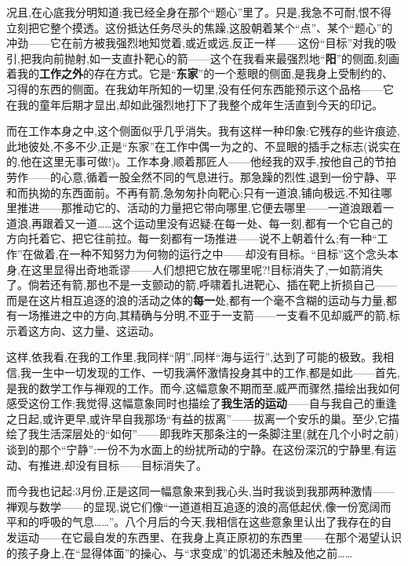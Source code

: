 况且,在心底我分明知道:我已经全身在那个“题心”里了。只是,我急不可耐,恨不得立刻把它整个摸透。这份抵达任务尽头的焦躁,这股朝着某个“点”、某个“题心”的冲劲——它在前方被我强烈地知觉着,或近或远,反正一样——这份“目标”对我的吸引,把我向前抛射,如一支直扑靶心的箭——这个在我看来最强烈地“\textbf{阳}”的侧面,刻画着我的\textbf{工作之外}的存在方式。它是“\textbf{东家}”的一个惹眼的侧面,是我身上受制约的、习得的东西的侧面。在我幼年所知的一切里,没有任何东西能预示这个品格——它在我的童年后期才显出,却如此强烈地打下了我整个成年生活直到今天的印记。

而在工作本身之中,这个侧面似乎几乎消失。我有这样一种印象:它残存的些许痕迹,此地彼处,不多不少,正是“东家”在工作中偶一为之的、不显眼的插手之标志(说实在的,他在这里无事可做!)。工作本身,顺着那匠人——他经我的双手,按他自己的节拍劳作——的心意,循着一股全然不同的气息进行。那急躁的烈性,退到一份宁静、平和而执拗的东西面前。不再有箭,急匆匆扑向靶心;只有一道浪,铺向极远,不知往哪里推进——那推动它的、活动的力量把它带向哪里,它便去哪里——一道浪跟着一道浪,再跟着又一道……这个运动里没有迟疑:在每一处、每一刻,都有一个它自己的方向托着它、把它往前拉。每一刻都有一场推进——说不上朝着什么;有一种“工作”在做着,在一种不知努力为何物的运行之中——却没有目标。“目标”这个念头本身,在这里显得出奇地乖谬——人们想把它放在哪里呢?!目标消失了,一如\dmark{}箭消失了。倘若还有箭,那也不是一支颤动的箭,呼啸着扎进靶心、插在靶上折损自己——而是在这片相互追逐的浪的活动之体的\textbf{每一}处,都有一个毫不含糊的运动与力量,都有一场推进之中的方向,其精确与分明,不亚于一支箭——一支看不见却威严的箭,标示着这方向、这力量、这运动。

这样,依我看,在我的工作里,我同样“阴”,同样“海与运行”,达到了可能的极致。我相信,我一生中一切发现的工作、一切我满怀激情投身其中的工作,都是如此——首先,是我的数学工作与禅观的工作。而今,这幅意象不期而至,威严而骤然,描绘出我如何感受这份工作;我觉得,这幅意象同时也描绘了\textbf{我生活的运动}——自与我自己的重逢之日起,或许更早,或许早自我那场“有益的拔离”——拔离一个安乐的巢。至少,它描绘了我生活深层处的“如何”——即我昨天那条注的一条脚注里(就在几个小时之前)谈到的那个“宁静”:一份不为水面上的纷扰所动的宁静。在这份深沉的宁静里,有运动、有推进,却没有目标——目标消失了。

而今我也记起:3月份,正是这同一幅意象来到我心头,当时我谈到我那两种激情——禅观与数学——的显现,说它们像“一道道相互追逐的浪的高低起伏,像一份宽阔而平和的呼吸的气息……”。八个月后的今天,我相信在这些意象里认出了我存在的自发运动——在它最自发的东西里、在我身上真正原初的东西里——在那个渴望认识的孩子身上,在“显得体面”的操心、与“求变成”的饥渴还未触及他之前……

